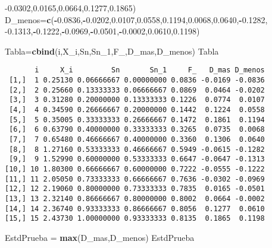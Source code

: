 \documentclass[
  a4paper,
  oneside,
  openany]{book}
\newenvironment{Shaded}{\begin{snugshade}}{\end{snugshade}}
\newcommand{\DecValTok}[1]{\textcolor[rgb]{0.00,0.00,0.81}{#1}}
\newcommand{\FloatTok}[1]{\textcolor[rgb]{0.00,0.00,0.81}{#1}}
\newcommand{\KeywordTok}[1]{\textcolor[rgb]{0.13,0.29,0.53}{\textbf{#1}}}
\newcommand{\NormalTok}[1]{#1}
\newcommand{\OperatorTok}[1]{\textcolor[rgb]{0.81,0.36,0.00}{\textbf{#1}}}
\newcommand{\StringTok}[1]{\textcolor[rgb]{0.31,0.60,0.02}{#1}}
\begin{document}
\begin{Shaded}
\begin{Highlighting}[]
                \FloatTok{{-}0.0302}\NormalTok{,}\FloatTok{0.0165}\NormalTok{,}\FloatTok{0.0664}\NormalTok{,}\FloatTok{0.1277}\NormalTok{,}\FloatTok{0.1865}\NormalTok{)}
\NormalTok{D\_menos=}\KeywordTok{c}\NormalTok{(}\OperatorTok{{-}}\FloatTok{0.0836}\NormalTok{,}\OperatorTok{{-}}\FloatTok{0.0202}\NormalTok{,}\FloatTok{0.0107}\NormalTok{,}\FloatTok{0.0558}\NormalTok{,}\FloatTok{0.1194}\NormalTok{,}\FloatTok{0.0068}\NormalTok{,}\FloatTok{0.0640}\NormalTok{,}\OperatorTok{{-}}\FloatTok{0.1282}\NormalTok{,}
          \FloatTok{{-}0.1313}\NormalTok{,}\OperatorTok{{-}}\FloatTok{0.1222}\NormalTok{,}\OperatorTok{{-}}\FloatTok{0.0969}\NormalTok{,}\OperatorTok{{-}}\FloatTok{0.0501}\NormalTok{,}\OperatorTok{{-}}\FloatTok{0.0002}\NormalTok{,}\FloatTok{0.0610}\NormalTok{,}\FloatTok{0.1198}\NormalTok{)}

\NormalTok{Tabla=}\KeywordTok{cbind}\NormalTok{(i,X\_i,Sn,Sn\_}\DecValTok{1}\NormalTok{,F\_,D\_mas,D\_menos)                                                                                                                                                      }
\NormalTok{Tabla}
\end{Highlighting}
\end{Shaded}

\begin{verbatim}
       i     X_i         Sn       Sn_1     F_   D_mas D_menos
 [1,]  1 0.25130 0.06666667 0.00000000 0.0836 -0.0169 -0.0836
 [2,]  2 0.25660 0.13333333 0.06666667 0.0869  0.0464 -0.0202
 [3,]  3 0.31280 0.20000000 0.13333333 0.1226  0.0774  0.0107
 [4,]  4 0.34590 0.26666667 0.20000000 0.1442  0.1224  0.0558
 [5,]  5 0.35005 0.33333333 0.26666667 0.1472  0.1861  0.1194
 [6,]  6 0.63790 0.40000000 0.33333333 0.3265  0.0735  0.0068
 [7,]  7 0.65480 0.46666667 0.40000000 0.3360  0.1306  0.0640
 [8,]  8 1.27160 0.53333333 0.46666667 0.5949 -0.0615 -0.1282
 [9,]  9 1.52990 0.60000000 0.53333333 0.6647 -0.0647 -0.1313
[10,] 10 1.80300 0.66666667 0.60000000 0.7222 -0.0555 -0.1222
[11,] 11 2.05050 0.73333333 0.66666667 0.7636 -0.0302 -0.0969
[12,] 12 2.19060 0.80000000 0.73333333 0.7835  0.0165 -0.0501
[13,] 13 2.32140 0.86666667 0.80000000 0.8002  0.0664 -0.0002
[14,] 14 2.36740 0.93333333 0.86666667 0.8056  0.1277  0.0610
[15,] 15 2.43730 1.00000000 0.93333333 0.8135  0.1865  0.1198
\end{verbatim}

\begin{Shaded}
\begin{Highlighting}[]
\NormalTok{EstdPrueba =}\StringTok{ }\KeywordTok{max}\NormalTok{(D\_mas,D\_menos)}
\NormalTok{EstdPrueba}
\end{Highlighting}
\end{Shaded}
\end{document}
